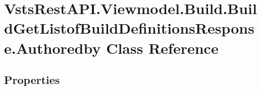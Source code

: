 \hypertarget{class_vsts_rest_a_p_i_1_1_viewmodel_1_1_build_1_1_build_get_listof_build_definitions_response_1_1_authoredby}{}\section{Vsts\+Rest\+A\+P\+I.\+Viewmodel.\+Build.\+Build\+Get\+Listof\+Build\+Definitions\+Response.\+Authoredby Class Reference}
\label{class_vsts_rest_a_p_i_1_1_viewmodel_1_1_build_1_1_build_get_listof_build_definitions_response_1_1_authoredby}
\subsection*{Properties}
